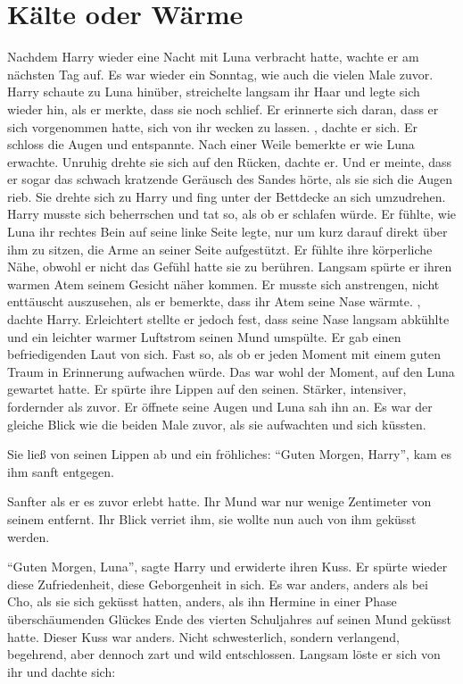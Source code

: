 \chapter{Kälte oder Wärme}


Nachdem Harry wieder eine Nacht mit Luna verbracht hatte, wachte er am nächsten Tag auf. Es war wieder ein Sonntag, wie auch die vielen Male zuvor. Harry schaute zu Luna hinüber, streichelte langsam ihr Haar und legte sich wieder hin, als er merkte, dass sie noch schlief. Er erinnerte sich daran, dass er sich vorgenommen hatte, sich von ihr wecken zu lassen. , dachte er sich. Er schloss die Augen und entspannte. Nach einer Weile bemerkte er wie Luna erwachte. Unruhig drehte sie sich auf den Rücken, dachte er. Und er meinte, dass er sogar das schwach kratzende Geräusch des Sandes hörte, als sie sich die Augen rieb. Sie drehte sich zu Harry und fing unter der Bettdecke an sich umzudrehen. Harry musste sich beherrschen und tat so, als ob er schlafen würde. Er fühlte, wie Luna ihr rechtes Bein auf seine linke Seite legte, nur um kurz darauf direkt über ihm zu sitzen, die Arme an seiner Seite aufgestützt. Er fühlte ihre körperliche Nähe, obwohl er nicht das Gefühl hatte sie zu berühren. Langsam spürte er ihren warmen Atem seinem Gesicht näher kommen. Er musste sich anstrengen, nicht enttäuscht auszusehen, als er bemerkte, dass ihr Atem seine Nase wärmte. , dachte Harry.  Erleichtert stellte er jedoch fest, dass seine Nase langsam abkühlte und ein leichter warmer Luftstrom seinen Mund umspülte. Er gab einen befriedigenden Laut von sich. Fast so, als ob er jeden Moment mit einem guten Traum in Erinnerung aufwachen würde. Das war wohl der Moment, auf den Luna gewartet hatte. Er spürte ihre Lippen auf den seinen. Stärker, intensiver, fordernder als zuvor. Er öffnete seine Augen und Luna sah ihn an. Es war der gleiche Blick wie die beiden Male zuvor, als sie aufwachten und sich küssten.

Sie ließ von seinen Lippen ab und ein fröhliches: \enquote{Guten Morgen, Harry}, kam es ihm sanft entgegen.

Sanfter als er es zuvor erlebt hatte. Ihr Mund war nur wenige Zentimeter von seinem entfernt. Ihr Blick verriet ihm, sie wollte nun auch von ihm geküsst werden.

\enquote{Guten Morgen, Luna}, sagte Harry und erwiderte ihren Kuss. Er spürte wieder diese Zufriedenheit, diese Geborgenheit in sich. Es war anders, anders als bei Cho, als sie sich geküsst hatten, anders, als ihn Hermine in einer Phase überschäumenden Glückes Ende des vierten Schuljahres auf seinen Mund geküsst hatte. Dieser Kuss war anders. Nicht schwesterlich, sondern verlangend, begehrend, aber dennoch zart und wild entschlossen. Langsam löste er sich von ihr und dachte sich: 

